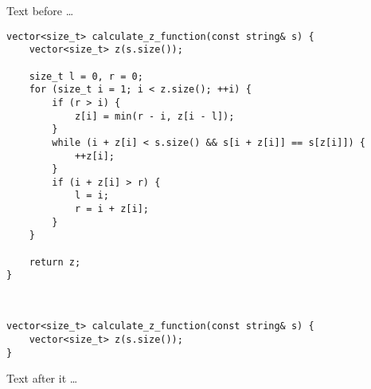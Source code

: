 \documentclass{article}
\begin{document}
Text before \dots
\begin{lstlisting}
vector<size_t> calculate_z_function(const string& s) {
    vector<size_t> z(s.size());

    size_t l = 0, r = 0;
    for (size_t i = 1; i < z.size(); ++i) {
        if (r > i) {
            z[i] = min(r - i, z[i - l]);
        }
        while (i + z[i] < s.size() && s[i + z[i]] == s[z[i]]) {
            ++z[i];
        }
        if (i + z[i] > r) {
            l = i;
            r = i + z[i];
        }
    }

    return z;
}



\end{lstlisting}

\begin{lstlisting}
vector<size_t> calculate_z_function(const string& s) {
    vector<size_t> z(s.size());
}
\end{lstlisting}

Text after it \dots
\end{document}

